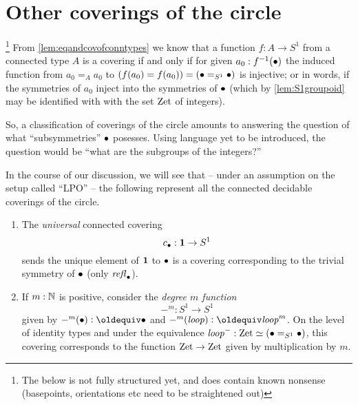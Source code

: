 \section{Other coverings of the circle}
\label{sec:covS1}

\footnote{The below is not fully structured yet, and does contain known nonsense (basepoints, orientations etc need to be straightened out)}
From \cref{lem:eqandcovofconntypes} we know that a function $f:A\to S^1$ from a connected type $A$ is a covering if and only if for given $a_0:f^{-1}(\bullet)$ the induced function from $a_0=_Aa_0$ to $(f(a_0)=f(a_0))=(\bullet=_{S^1}\bullet)$ is injective; or in words, if the symmetries of $a_0$ inject into the symmetries of $\bullet$ (which by \cref{lem:S1groupoid} may be identified with with the set $\mathrm{Zet}$ of integers).

So, a classification of coverings of the circle amounts to answering the question of what ``subsymmetries'' $\bullet$ posesses.  Using language yet to be introduced, the question would be ``what are the subgroups of the integers?''

\begin{example}
  \label{ex:listofS1covers}
  In the course of our discussion, we will see that -- under an assumption on the setup called ``LPO'' -- the following represent all the connected decidable coverings of the circle.
  \begin{enumerate}
  \item The \emph{universal} connected covering  $$c_\bullet:\mathbf{1}\to S^1$$ sends the unique element of $\mathbf{1}$ to $\bullet$ is a covering corresponding to the trivial symmetry of $\bullet$ (\ie only $\mathop{{\it refl}_{\bullet}}$).  
  \item If $m:\mathbb{N}$ is positive, consider the \emph{degree $m$ function} $$-^m:S^1\to S^1$$ given by $-^m(\base)\defequi\base$ and $-^m(\Sloop)\defequi\Sloop^m$.  On the level of identity types and under the equivalence $\mathit{loop}^-:\mathrm{Zet}\simeq(\bullet=_{S^1}\bullet)$, this covering corresponds to the function $\mathrm{Zet}\to\mathrm{Zet}$ given by multiplication by $m$.
  \end{enumerate}
\end{example}

